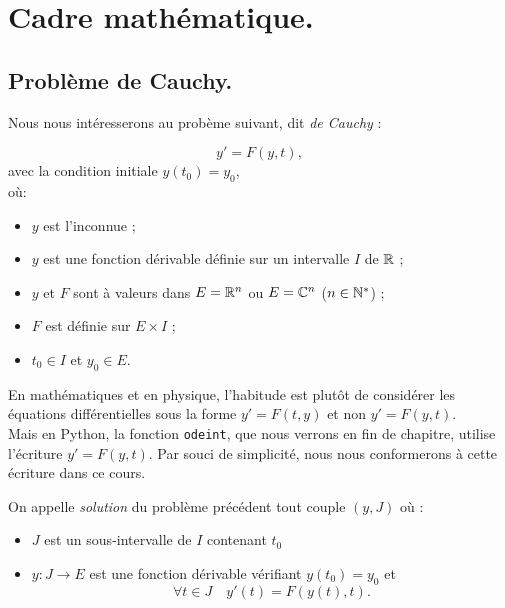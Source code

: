 \section{Cadre mathématique.}

\subsection{Problème de Cauchy.}

Nous nous intéresserons au probème suivant, dit \emph{de Cauchy} :

\begin{equation}
  \label{eq:o1}
  y' = F(y,t),
\end{equation}
avec la condition initiale $y(t_{0})=y_{0}$,\\

où:
\begin{itemize}
\item $y$ est l'inconnue ;
\item $y$ est une fonction dérivable définie sur un intervalle $I$ de $\mathbb{R}$ ;
\item $y$ et $F$ sont à valeurs dans $E = \mathbb{R}^{n}$ ou $E=\mathbb{C}^{n}$ ($n\in\mathbb{N}^{*}$) ;
\item $F$ est définie sur $E\times I$ ;
\item $t_{0}\in I$ et $y_{0}\in E$.
\end{itemize}


\begin{rem}
En mathématiques et en physique, l'habitude est plutôt de considérer les équations 
différentielles sous la forme $y'=F(t,y)$ et non $y'=F(y,t)$.\\
Mais en Python, la fonction \texttt{odeint}, que nous verrons en fin de chapitre, 
utilise l'écriture $y'=F(y,t)$. Par souci de simplicité, nous nous conformerons à cette 
écriture dans ce cours.
\end{rem}



On appelle \emph{solution} du problème précédent tout couple $(y,J)$ où :
\begin{itemize}
\item $J$ est un sous-intervalle de $I$ contenant $t_{0}$
\item $y : J\to E$ est une fonction dérivable vérifiant $y(t_{0})=y_{0}$ et
  \begin{equation*}
    \forall t \in J\quad y'(t)=F(y(t),t).
  \end{equation*}
\end{itemize}

